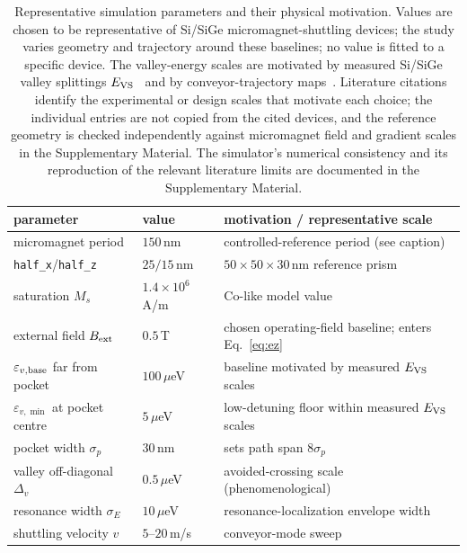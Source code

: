 \documentclass[aip,jap,reprint,superscriptaddress,longbibliography,floatfix]{revtex4-2}
\begin{document}
\begin{table}[!tp]
\centering
\caption{Representative simulation parameters and their physical
motivation. Values are chosen to be representative of Si/SiGe
micromagnet-shuttling devices; the study varies geometry and
trajectory around these baselines; no value is fitted to a specific device. The valley-energy scales are motivated by measured Si/SiGe
valley splittings $E_{\rm VS}$~\cite{paquelet_wuetz_atomic_2022,losert_practical_2023}
and by conveyor-trajectory
maps~\cite{volmer_mapping_2024,volmer_impact_2026}. Literature citations
identify the experimental or design scales that motivate each choice; the individual entries are not copied from
the cited devices, and the reference geometry is checked independently
against micromagnet field and gradient scales in the Supplementary
Material. The simulator's numerical consistency
and its reproduction of the relevant literature limits are documented in
the Supplementary Material.}
\label{tab:params}
\begin{tabular}{lll}
\toprule
parameter & value & motivation / representative scale \\
\midrule
micromagnet period       & $150$\,nm        & controlled-reference period (see caption) \\
\texttt{half\_x}/\texttt{half\_z} & $25/15$\,nm & $50\times50\times30$\,nm reference prism \\
saturation $M_s$          & $1.4\times10^6$\,A/m & Co-like model value \\
external field $B_{\rm ext}$ & $0.5$\,T         & chosen operating-field baseline; enters Eq.~\eqref{eq:ez} \\
$\varepsilon_{v,\rm base}$ far from pocket & $100\,\mu$eV & baseline motivated by measured $E_{\rm VS}$ scales \\
$\varepsilon_{v,\min}$ at pocket centre & $5\,\mu$eV & low-detuning floor within measured $E_{\rm VS}$ scales \\
pocket width $\sigma_p$   & $30$\,nm         & sets path span $8\sigma_p$ \\
valley off-diagonal $\Delta_v$ & $0.5\,\mu$eV & avoided-crossing scale (phenomenological) \\
resonance width $\sigma_E$ & $10\,\mu$eV     & resonance-localization envelope width   \\
shuttling velocity $v$    & $5$--$20$\,m/s   & conveyor-mode sweep~\cite{seidler_conveyor-mode_2022,langrock_blueprint_2023} \\
\bottomrule
\end{tabular}
\end{table}
\end{document}

